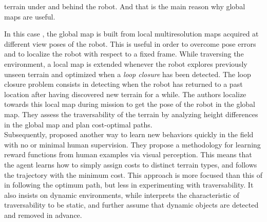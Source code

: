 \documentclass[12pt,a4paper]{report}
\newcommand{\term}{\textit}
\begin{document}
	terrain under and behind the robot. And that is the main reason why global maps 
	are useful. 
	\par
	In this case \citep{Droeschel}, the global map is built from local multiresolution 
	maps acquired at different view poses of the robot. This is useful in order to 
	overcome pose errors and to localize the robot with respect to a fixed frame. 
	While traversing the environment, a local map is extended whenever the robot 
	explores previously unseen terrain and optimized when a \term{loop closure} has 
	been detected. The loop closure problem consists in detecting when the robot has 
	returned to a past location after having discovered new terrain for a while. The 
	authors localize towards this local map during mission to get the pose of the 
	robot in the global map. They assess the traversability of the terrain by 
	analyzing height differences in the global map and plan cost-optimal paths.
	\\
	
	Subsequently, \citet{Wigness} proposed another way to learn new behaviors quickly 
	in the field with no or minimal human supervision. They propose a methodology for 
	learning reward functions from human examples via visual perception. This means 
	that the agent learns how to simply assign costs to distinct terrain types, and 
	follows the trajectory with the minimum cost. This approach is more focused than 
	this of \citet{Suger} in following the optimum path, but less in experimenting 
	with traversability. It also insists on dynamic environments, while \citet{Suger} 
	interprets the characteristic of traversability to be static, and further assume 
	that dynamic objects are detected and removed in advance.
	\\
	
\end{document}
